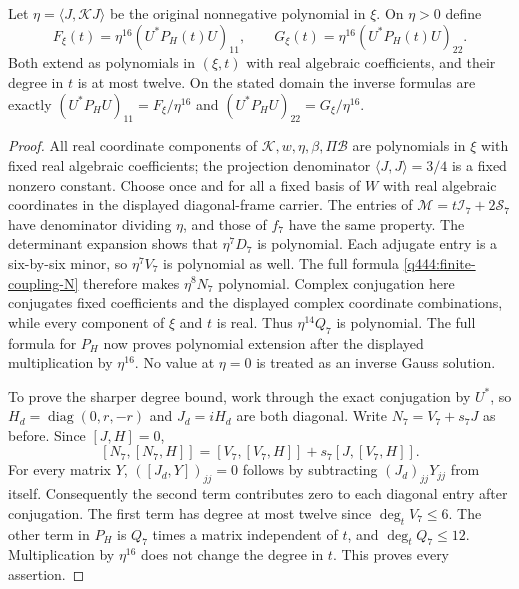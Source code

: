 \begin{lemma}
\label{q444:generic-polynomial-diagonals}
Let $\eta=\langle J,\mathcal KJ\rangle$ be the original nonnegative
polynomial in $\xi$. On $\eta>0$ define
\[
 F_\xi(t)=\eta^{16}(U^*P_H(t)U)_{11},\qquad
 G_\xi(t)=\eta^{16}(U^*P_H(t)U)_{22}.
\]
Both extend as polynomials in $(\xi,t)$ with real algebraic
coefficients, and their degree in $t$ is at most twelve.
On the stated domain the inverse formulas are exactly
$(U^*P_HU)_{11}=F_\xi/\eta^{16}$ and
$(U^*P_HU)_{22}=G_\xi/\eta^{16}$.
\end{lemma}
\begin{proof}
All real coordinate components of $\mathcal K,w,\eta,\beta,\Pi\mathscr B$
are polynomials in $\xi$ with fixed real algebraic coefficients; the
projection denominator $\langle J,J\rangle=3/4$ is a fixed nonzero
constant. Choose once and for all a fixed basis of $W$ with real
algebraic coordinates in the displayed diagonal-frame carrier.
The entries of $\mathscr M=t\mathcal I_7+2\mathcal S_7$ have
denominator dividing $\eta$, and those of $f_7$ have the same property.
The determinant expansion shows that $\eta^7D_7$ is polynomial.
Each adjugate entry is a six-by-six minor, so $\eta^7V_7$ is
polynomial as well. The full formula
\eqref{q444:finite-coupling-N} therefore makes $\eta^8N_7$
polynomial. Complex conjugation here conjugates fixed coefficients and
the displayed complex coordinate combinations, while every component of
$\xi$ and $t$ is real. Thus $\eta^{14}Q_7$ is polynomial.
The full formula for $P_H$ now proves polynomial extension after the
displayed multiplication by $\eta^{16}$. No value at $\eta=0$
is treated as an inverse Gauss solution.

To prove the sharper degree bound, work through the exact conjugation
by $U^*$, so $H_d=\operatorname{diag}(0,r,-r)$ and
$J_d=iH_d$ are both diagonal. Write $N_7=V_7+s_7J$ as before.
Since $[J,H]=0$,
\[
 [N_7,[N_7,H]]=[V_7,[V_7,H]]+s_7[J,[V_7,H]].
\]
For every matrix $Y$, $([J_d,Y])_{jj}=0$ follows by subtracting
$(J_d)_{jj}Y_{jj}$ from itself. Consequently the second term contributes
zero to each diagonal entry after conjugation. The first term has
degree at most twelve since $\deg_t V_7\le6$. The other term in
$P_H$ is $Q_7$ times a matrix independent of $t$, and
$\deg_t Q_7\le12$. Multiplication by $\eta^{16}$ does not
change the degree in $t$. This proves every assertion.
\end{proof}

